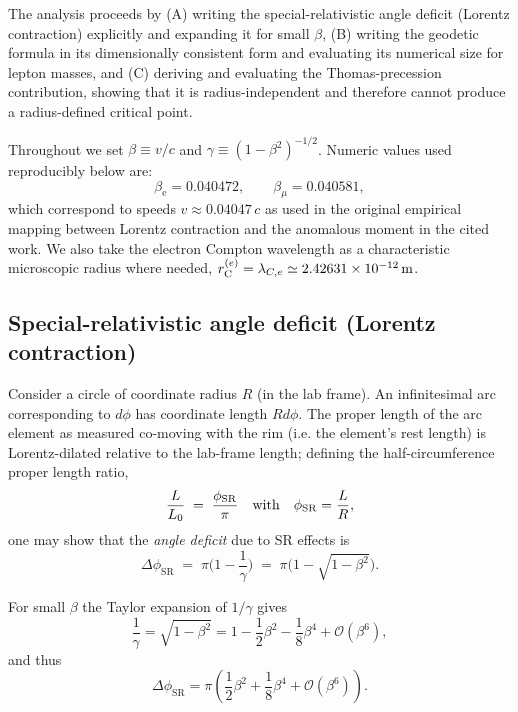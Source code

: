 \documentclass[%
 reprint,
 amsmath,amssymb,
 aps,
]{revtex4-1}
\numberwithin{equation}{section}%
\begin{document}
The analysis proceeds by (A) writing the special-relativistic angle deficit (Lorentz contraction) explicitly and expanding it for small $\beta$, (B) writing the geodetic formula in its dimensionally consistent form and evaluating its numerical size for lepton masses, and (C) deriving and evaluating the Thomas-precession contribution, showing that it is radius-independent and therefore cannot produce a radius-defined critical point.

Throughout we set $\beta\equiv v/c$ and $\gamma\equiv(1-\beta^{2})^{-1/2}$. Numeric values used reproducibly below are:
\[
\beta_{\mathrm{e}}=0.040472,\qquad \beta_{\mu}=0.040581,
\]
which correspond to speeds $v\approx 0.04047\,c$ as used in the original empirical mapping between Lorentz contraction and the anomalous moment in the cited work. We also take the electron Compton wavelength as a characteristic microscopic radius where needed, $r_{\rm C}^{(e)}=\lambda_{C,e}\simeq 2.42631\times10^{-12}\,\mathrm{m}$.

\subsection{Special-relativistic angle deficit (Lorentz contraction)}

Consider a circle of coordinate radius $R$ (in the lab frame). An infinitesimal arc corresponding to $d\phi$ has coordinate length $Rd\phi$. The proper length of the arc element as measured co-moving with the rim (i.e. the element's rest length) is Lorentz-dilated relative to the lab-frame length; defining the half-circumference proper length ratio,
\begin{equation}
\frac{L}{L_0} \;=\; \frac{\phi_{\rm SR}}{\pi}
\quad\text{with}\quad
\phi_{\rm SR}=\frac{L}{R},
\label{eq:length_angle_relation}
\end{equation}
one may show that the \emph{angle deficit} due to SR effects is
\begin{equation}
\Delta\phi_{\mathrm{SR}} \;=\; \pi\Big(1-\frac{1}{\gamma}\Big)
\;=\; \pi\Big(1-\sqrt{1-\beta^{2}}\Big).
\label{eq:delta_phi_SR}
\end{equation}

For small $\beta$ the Taylor expansion of $1/\gamma$ gives
\begin{equation}
\frac{1}{\gamma}=\sqrt{1-\beta^{2}}=1-\frac{1}{2}\beta^{2}-\frac{1}{8}\beta^{4}+\mathcal{O}(\beta^{6}),
\label{eq:gamma_series}
\end{equation}
and thus
\begin{equation}
\Delta\phi_{\mathrm{SR}}=\pi\left(\frac{1}{2}\beta^{2}+\frac{1}{8}\beta^{4}+\mathcal{O}(\beta^{6})\right).
\label{eq:delta_phi_SR_series}
\end{equation}
\end{document}
